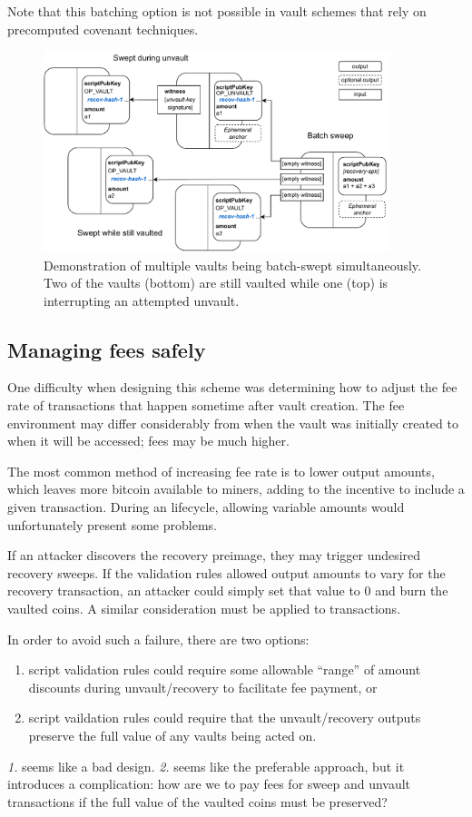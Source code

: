 \documentclass[10pt]{article}
\begin{document}
Note that this batching option is not possible in vault schemes that rely on
precomputed covenant techniques.

\begin{figure}[H]
\includegraphics[width=0.9\textwidth]{batch-sweep.pdf}
\centering
\caption{Demonstration of multiple vaults being batch-swept simultaneously. Two of
  the vaults (bottom) are still vaulted while one (top) is interrupting an attempted unvault.}
\end{figure}

\subsection*{Managing fees safely}

One difficulty when designing this scheme was determining how to adjust the fee rate of
transactions that happen sometime after vault creation. The fee environment may differ
considerably from when the vault was initially created to when it will be accessed;
fees may be much higher. 

The most common method of increasing fee rate is to lower output
amounts, which leaves more bitcoin available to miners, adding to the
incentive to include a given transaction.
During an \opv{} lifecycle, allowing variable amounts would unfortunately
present some problems.

If an attacker discovers the recovery preimage, they may trigger undesired recovery
sweeps. If the \opv{} validation rules allowed output amounts to vary for the recovery
transaction, an attacker could simply set that value to 0 and burn the vaulted coins. 
A similar consideration must be applied to \opuv{} transactions.

In order to avoid such a failure, there are two options:

\begin{enumerate}
  \item script validation rules could require some allowable ``range'' of
    amount discounts during unvault/recovery to facilitate fee payment, or

  \item script vaildation rules could require that the unvault/recovery
    outputs preserve the full value of any vaults being acted on. 

\end{enumerate}
\emph{1.} seems like a bad design. \emph{2.} seems like the preferable approach, but it
introduces a complication: how are we to pay fees for sweep and
unvault transactions if the full value of the vaulted coins must be preserved?
\end{document}
